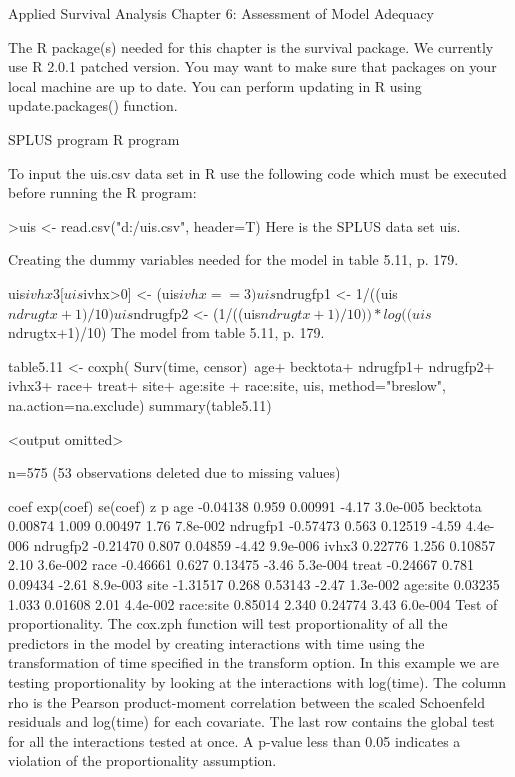 Applied Survival Analysis
Chapter 6: Assessment of Model Adequacy

The R package(s) needed for this chapter is the survival package. We currently use R 2.0.1 patched version. You may want to make sure that packages on your local machine are up to date. You can perform updating in R using update.packages() function.

SPLUS program 
R program

To input the uis.csv data set in R use the following code which must be executed before running the R program:

>uis <- read.csv("d:/uis.csv", header=T)
Here is the SPLUS data set uis.

Creating the dummy variables needed for the model in table 5.11, p. 179.

uis$ivhx3[uis$ivhx>0] <- (uis$ivhx==3)

uis$ndrugfp1 <- 1/((uis$ndrugtx+1)/10)
uis$ndrugfp2 <- (1/((uis$ndrugtx+1)/10))*log((uis$ndrugtx+1)/10)
The model from table 5.11, p. 179.

table5.11 <- coxph( Surv(time, censor)~age+ becktota+ ndrugfp1+ ndrugfp2+ ivhx3+ race+
  treat+ site+ age:site + race:site, uis, method="breslow", na.action=na.exclude)
summary(table5.11)

<output omitted>

  n=575 (53 observations deleted due to missing values)

              coef exp(coef) se(coef)     z        p 
      age -0.04138     0.959  0.00991 -4.17 3.0e-005
 becktota  0.00874     1.009  0.00497  1.76 7.8e-002
 ndrugfp1 -0.57473     0.563  0.12519 -4.59 4.4e-006
 ndrugfp2 -0.21470     0.807  0.04859 -4.42 9.9e-006
    ivhx3  0.22776     1.256  0.10857  2.10 3.6e-002
     race -0.46661     0.627  0.13475 -3.46 5.3e-004
    treat -0.24667     0.781  0.09434 -2.61 8.9e-003
     site -1.31517     0.268  0.53143 -2.47 1.3e-002
 age:site  0.03235     1.033  0.01608  2.01 4.4e-002
race:site  0.85014     2.340  0.24774  3.43 6.0e-004
Test of proportionality. 
The cox.zph function will test proportionality of all the predictors in the model by creating interactions with time using the transformation of time specified in the transform option. In this example we are testing proportionality by looking at the interactions with log(time). The column rho is the Pearson product-moment correlation between the scaled Schoenfeld residuals and log(time) for each covariate. The last row contains the global test for all the interactions tested at once. A p-value less than 0.05 indicates a violation of the proportionality assumption.

